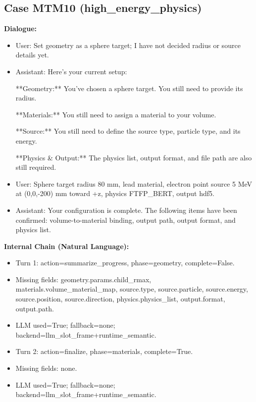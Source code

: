 \documentclass[11pt]{ctexart}
\begin{document}
\subsection{Case MTM10 (high\_energy\_physics)}
\textbf{Dialogue:}
\begin{itemize}
\item User: Set geometry as a sphere target; I have not decided radius or source details yet.
\item Assistant: Here's your current setup:

**Geometry:** You've chosen a sphere target. You still need to provide its radius.

**Materials:** You still need to assign a material to your volume.

**Source:** You still need to define the source type, particle type, and its energy.

**Physics \& Output:** The physics list, output format, and file path are also still required.
\item User: Sphere target radius 80 mm, lead material, electron point source 5 MeV at (0,0,-200) mm toward +z, physics FTFP\_BERT, output hdf5.
\item Assistant: Your configuration is complete. The following items have been confirmed: volume-to-material binding, output path, output format, and physics list.
\end{itemize}
\textbf{Internal Chain (Natural Language):}
\begin{itemize}
\item Turn 1: action=summarize\_progress, phase=geometry, complete=False.
\item Missing fields: geometry.params.child\_rmax, materials.volume\_material\_map, source.type, source.particle, source.energy, source.position, source.direction, physics.physics\_list, output.format, output.path.
\item LLM used=True; fallback=none; backend=llm\_slot\_frame+runtime\_semantic.
\item Turn 2: action=finalize, phase=materials, complete=True.
\item Missing fields: none.
\item LLM used=True; fallback=none; backend=llm\_slot\_frame+runtime\_semantic.
\end{itemize}
\end{document}
